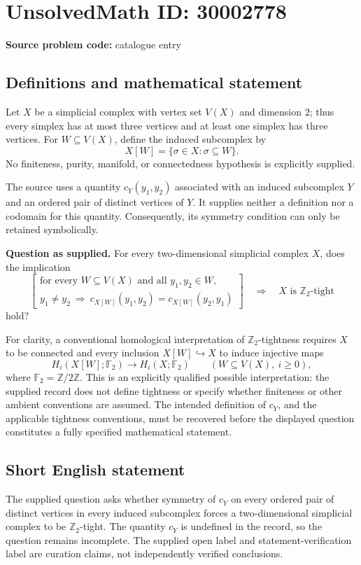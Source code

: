 \documentclass[11pt]{article}
\begin{document}
\section*{UnsolvedMath ID: 30002778}
\textbf{Source problem code:} catalogue entry
\subsection{Definitions and mathematical statement}
Let \(X\) be a simplicial complex with vertex set \(V(X)\) and dimension \(2\); thus every simplex has at most three vertices and at least one simplex has three vertices. For \(W\subseteq V(X)\), define the induced subcomplex by
\[
X[W]=\{\sigma\in X:\sigma\subseteq W\}.
\]
No finiteness, purity, manifold, or connectedness hypothesis is explicitly supplied.

The source uses a quantity \(c_Y(y_1,y_2)\) associated with an induced subcomplex \(Y\) and an ordered pair of distinct vertices of \(Y\). It supplies neither a definition nor a codomain for this quantity. Consequently, its symmetry condition can only be retained symbolically.

\textbf{Question as supplied.} For every two-dimensional simplicial complex \(X\), does the implication
\[
\left[
\begin{gathered}
\text{for every }W\subseteq V(X)\text{ and all }y_1,y_2\in W,\\
y_1\ne y_2\ \Longrightarrow\
c_{X[W]}(y_1,y_2)=c_{X[W]}(y_2,y_1)
\end{gathered}
\right]
\quad\Longrightarrow\quad
X\text{ is }\mathbb Z_2\text{-tight}
\]
hold?

For clarity, a conventional homological interpretation of \(\mathbb Z_2\)-tightness requires \(X\) to be connected and every inclusion \(X[W]\hookrightarrow X\) to induce injective maps
\[
H_i(X[W];\mathbb F_2)\longrightarrow H_i(X;\mathbb F_2)
\qquad(W\subseteq V(X),\ i\geq 0),
\]
where \(\mathbb F_2=\mathbb Z/2\mathbb Z\). This is an explicitly qualified possible interpretation: the supplied record does not define tightness or specify whether finiteness or other ambient conventions are assumed. The intended definition of \(c_Y\), and the applicable tightness conventions, must be recovered before the displayed question constitutes a fully specified mathematical statement.
\subsection{Short English statement}
The supplied question asks whether symmetry of \(c_Y\) on every ordered pair of distinct vertices in every induced subcomplex forces a two-dimensional simplicial complex to be \(\mathbb Z_2\)-tight. The quantity \(c_Y\) is undefined in the record, so the question remains incomplete. The supplied open label and statement-verification label are curation claims, not independently verified conclusions.
\end{document}
